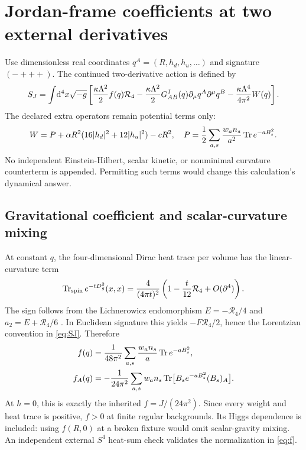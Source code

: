 \section{Jordan-frame coefficients at two external derivatives}

Use dimensionless real coordinates $q^A=(R,h_d,h_u,\ldots)$ and signature $(-+++)$. The continued two-derivative action is defined by
\begin{equation}
 S_J=\int\!\mathrm d^4x\sqrt{-g}\left[
 \frac{\kappa\Lambda^2}{2}f(q)\mathcal R_4
 -\frac{\kappa\Lambda^2}{2}G^{\mathrm J}_{AB}(q)\partial_\mu q^A\partial^\mu q^B
 -\frac{\kappa\Lambda^4}{4\pi^2}W(q)\right].
 \label{eq:SJ}
\end{equation}
The declared extra operators remain potential terms only:
\begin{equation}
 W=P+\alpha R^2(16|h_d|^2+12|h_u|^2)-cR^2,\quad
 P=\frac12\sum_{a,s}\frac{w_an_s}{a^2}\operatorname{Tr} e^{-aB_s^2}.
\end{equation}
No independent Einstein-Hilbert, scalar kinetic, or nonminimal curvature counterterm is appended. Permitting such terms would change this calculation's dynamical answer.

\subsection{Gravitational coefficient and scalar-curvature mixing}

At constant $q$, the four-dimensional Dirac heat trace per volume has the linear-curvature term
\begin{equation}
 \operatorname{Tr}_{\rm spin}e^{-tD_g^2}(x,x)
 =\frac4{(4\pi t)^2}\left(1-\frac t{12}\mathcal R_4+O(\partial^4)\right).
\end{equation}
The sign follows from the Lichnerowicz endomorphism $E=-\mathcal R_4/4$ and $a_2=E+\mathcal R_4/6$ \cite{heat}. In Euclidean signature this yields $-F\mathcal R_4/2$, hence the Lorentzian convention in \eqref{eq:SJ}. Therefore
\begin{align}
 f(q)&=\frac1{48\pi^2}\sum_{a,s}\frac{w_an_s}{a}\operatorname{Tr} e^{-aB_s^2},\label{eq:f}\\
 f_A(q)&=-\frac1{24\pi^2}\sum_{a,s}w_an_s
       \operatorname{Tr}\bigl[B_s e^{-aB_s^2}(B_s)_A\bigr].\label{eq:df}
\end{align}
At $h=0$, this is exactly the inherited $f=J/(24\pi^2)$. Since every weight and heat trace is positive, $f>0$ at finite regular backgrounds. Its Higgs dependence is included: using $f(R,0)$ at a broken fixture would omit scalar-gravity mixing. An independent external $S^4$ heat-sum check validates the normalization in \eqref{eq:f}.

